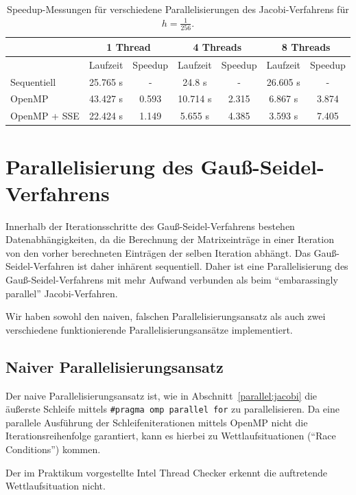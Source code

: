 \documentclass{article}
\begin{document}
\begin{table}[h!]
\centering
\small
\begin{tabular}{p{1.5cm}|c|c|c|c|c|c}
 & \multicolumn{2}{c|}{1 Thread} & \multicolumn{2}{c|}{4 Threads} & \multicolumn{2}{c}{8 Threads} \\ 
\hline 
 & Laufzeit & Speedup & Laufzeit & Speedup & Laufzeit & Speedup \\ 
\hline 
Sequentiell & 25.765 s & - & 24.8 s & - & 26.605 s & - \\
\hline
OpenMP & 43.427 s & 0.593 & 10.714 s & 2.315 & 6.867 s & 3.874 \\ 
\hline
OpenMP + SSE & 22.424 s & 1.149 & 5.655 s & 4.385 & 3.593 s & 7.405  \\ 
\hline 
\end{tabular}
\caption{\small{Speedup-Messungen für verschiedene Parallelisierungen des Jacobi-Verfahrens für $h=\frac{1}{256}$.}}
\end{table}

\section{Parallelisierung des Gauß-Seidel-Verfahrens}

Innerhalb der Iterationsschritte des Gauß-Seidel-Verfahrens bestehen Datenabhängigkeiten, da die Berechnung der Matrixeinträge in einer Iteration von den vorher berechneten Einträgen der selben Iteration abhängt. Das Gauß-Seidel-Verfahren ist daher inhärent sequentiell. Daher ist eine Parallelisierung des Gauß-Seidel-Verfahrens mit mehr Aufwand verbunden als beim ``embarassingly parallel'' Jacobi-Verfahren.

Wir haben sowohl den naiven, falschen Parallelisierungsansatz als auch zwei verschiedene funktionierende Parallelisierungsansätze implementiert.

\subsection{Naiver Parallelisierungsansatz}\label{gs:naiv}
Der naive Parallelisierungsansatz ist, wie in Abschnitt~\ref{parallel:jacobi} die äußerste Schleife mittels \texttt{\#pragma omp parallel for} zu parallelisieren. Da eine parallele Ausführung der Schleifeniterationen mittels OpenMP nicht die Iterationsreihenfolge garantiert, kann es hierbei zu Wettlaufsituationen (``Race Conditions'') kommen.

Der im Praktikum vorgestellte Intel Thread Checker erkennt die auftretende Wettlaufsituation nicht.
\end{document}
